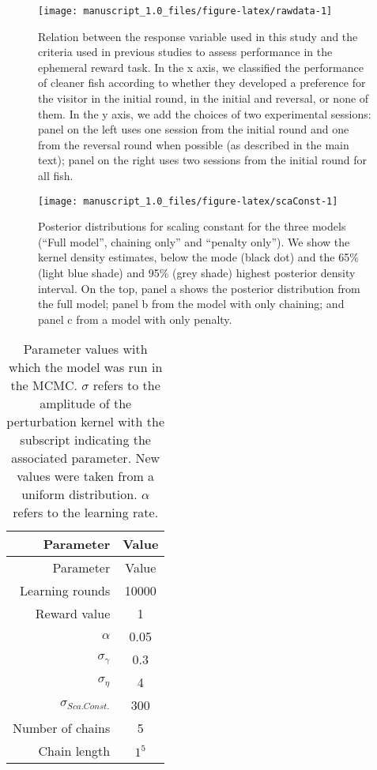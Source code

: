 \documentclass[]{rsos}%
\begin{document}
\begin{figure}

{\centering \texttt{[image: manuscript\_1.0\_files/figure-latex/rawdata-1]} 

}

\caption{Relation between the response variable used in this study and the
criteria used in previous studies to assess performance in the ephemeral reward
task. In the x axis, we classified the performance of cleaner fish according to
whether they developed a preference for the visitor in the initial round,
in the initial and reversal, or none of them. In the y axis, we add the choices
of two experimental sessions: panel on the left uses one session from the initial
round and one from the reversal round when possible
(as described in the main text); panel on the right uses two sessions from the
initial round for all fish.}\label{fig:rawdata}
\end{figure}








\begin{figure}[H]

{\centering \texttt{[image: manuscript\_1.0\_files/figure-latex/scaConst-1]} 

}

\caption{Posterior distributions for scaling constant for the three models
(``Full model'', chaining only'' and ``penalty only''). We show the kernel
density estimates, below the mode (black dot) and the 65\% (light blue shade)
and 95\% (grey shade) highest posterior density interval. On the top,
panel a shows the posterior distribution from the full model; panel b from
the model with only chaining; and panel c from a model with only penalty.}\label{fig:scaConst}
\end{figure}

\begin{longtable}[]{@{}rc@{}}
\caption{\label{tab:param} Parameter values with which the model was run
in the MCMC. \(\sigma\) refers to the amplitude of the perturbation kernel with the subscript indicating the associated parameter. New values were taken from a uniform distribution. \(\alpha\) refers to the learning rate.}\tabularnewline
\toprule
Parameter & Value \\
\midrule
\endfirsthead
\toprule
Parameter & Value \\
\midrule
\endhead
Learning rounds & 10000 \\
Reward value & 1 \\
\(\alpha\) & 0.05 \\
\(\sigma_{\gamma}\) & 0.3 \\
\(\sigma_{\eta}\) & 4 \\
\(\sigma_{Sca.Const.}\) & 300 \\
Number of chains & 5 \\
Chain length & \(1^5\) \\
\bottomrule
\end{longtable}
\end{document}
